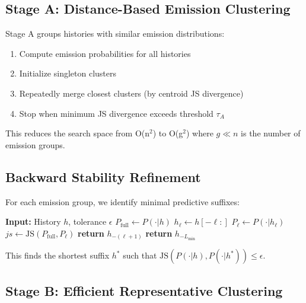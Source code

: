\documentclass[12pt]{article}
\begin{document}
\subsection{Stage A: Distance-Based Emission Clustering}

Stage A groups histories with similar emission distributions:

\begin{enumerate}
    \item Compute emission probabilities for all histories
    \item Initialize singleton clusters
    \item Repeatedly merge closest clusters (by centroid JS divergence)
    \item Stop when minimum JS divergence exceeds threshold $\tau_A$
\end{enumerate}

This reduces the search space from O(n$^2$) to O(g$^2$) where $g \ll n$ is the number of emission groups.

\subsection{Backward Stability Refinement}

For each emission group, we identify minimal predictive suffixes:

\begin{algorithm}
\caption{Backward Stability Test}
\begin{algorithmic}[1]
\STATE \textbf{Input:} History $h$, tolerance $\epsilon$
\STATE $P_{\text{full}} \leftarrow P(\cdot|h)$
    \STATE $h_\ell \leftarrow h[-\ell:]$ 
    \STATE $P_\ell \leftarrow P(\cdot|h_\ell)$
    \STATE $js \leftarrow \text{JS}(P_{\text{full}}, P_\ell)$
        \STATE \textbf{return} $h_{-(\ell+1)}$ 
    \ENDIF
\ENDFOR
\STATE \textbf{return} $h_{-L_{\min}}$ 
\end{algorithmic}
\end{algorithm}

This finds the shortest suffix $h^*$ such that $\text{JS}(P(\cdot|h), P(\cdot|h^*)) \leq \epsilon$.

\subsection{Stage B: Efficient Representative Clustering}
\end{document}
